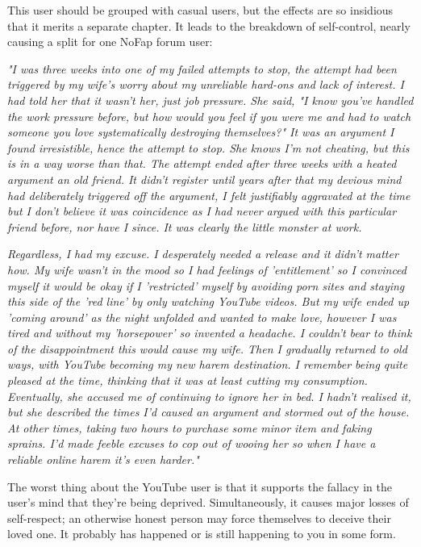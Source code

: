 \documentclass[easypeasy.tex]{subfiles}
\begin{document}
This user should be grouped with casual users, but the effects are so insidious that it merits a separate chapter. It leads to the breakdown of self-control, nearly causing a split for one NoFap forum user:

\textit{"I was three weeks into one of my failed attempts to stop, the attempt had been triggered by my wife's worry about my unreliable hard-ons and lack of interest. I had told her that it wasn't her, just job pressure. She said, "I know you've handled the work pressure before, but how would you feel if you were me and had to watch someone you love systematically destroying themselves?" It was an argument I found irresistible, hence the attempt to stop. She knows I'm not cheating, but this is in a way worse than that. The attempt ended after three weeks with a heated argument an old friend. It didn't register until years after that my devious mind had deliberately triggered off the argument, I felt justifiably aggravated at the time but I don't believe it was coincidence as I had never argued with this particular friend before, nor have I since. It was clearly the little monster at work.}

\textit{Regardless, I had my excuse. I desperately needed a release and it didn't matter how. My wife wasn't in the mood so I had feelings of 'entitlement' so I convinced myself it would be okay if I 'restricted' myself by avoiding porn sites and staying this side of the 'red line' by only watching YouTube videos. But my wife ended up 'coming around' as the night unfolded and wanted to make love, however I was tired and without my 'horsepower' so invented a headache. I couldn't bear to think of the disappointment this would cause my wife. Then I gradually returned to old ways, with YouTube becoming my new harem destination. I remember being quite pleased at the time, thinking that it was at least cutting my consumption. Eventually, she accused me of continuing to ignore her in bed. I hadn't realised it, but she described the times I'd caused an argument and stormed out of the house. At other times, taking two hours to purchase some minor item and faking sprains. I'd made feeble excuses to cop out of wooing her so when I have a reliable online harem it's even harder."}

The worst thing about the YouTube user is that it supports the fallacy in the user's mind that they're being deprived. Simultaneously, it causes major losses of self-respect; an otherwise honest person may force themselves to deceive their loved one. It probably has happened or is still happening to you in some form.
\end{document}
